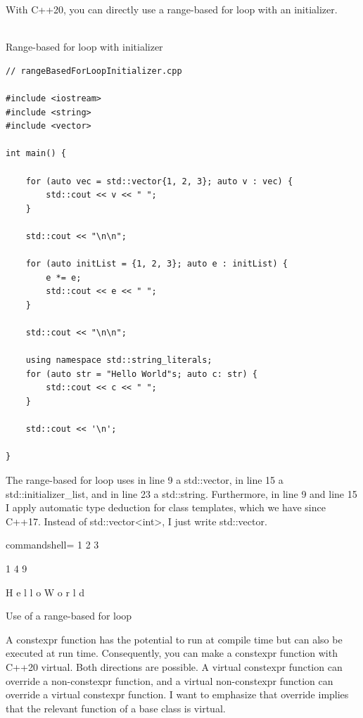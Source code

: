 
With C++20, you can directly use a range-based for loop with an initializer.

\hspace*{\fill} \\ %
\noindent
Range-based for loop with initializer
\begin{lstlisting}[style=styleCXX]
// rangeBasedForLoopInitializer.cpp

#include <iostream>
#include <string>
#include <vector>

int main() {

	for (auto vec = std::vector{1, 2, 3}; auto v : vec) {
		std::cout << v << " ";
	}
	
	std::cout << "\n\n";
	
	for (auto initList = {1, 2, 3}; auto e : initList) {
		e *= e;
		std::cout << e << " ";
	}
	
	std::cout << "\n\n";
	
	using namespace std::string_literals;
	for (auto str = "Hello World"s; auto c: str) {
		std::cout << c << " ";
	}
	
	std::cout << '\n';

}
\end{lstlisting}

The range-based for loop uses in line 9 a std::vector, in line 15 a std::initializer\_list, and in line 23 a std::string. Furthermore, in line 9 and line 15 I apply automatic type deduction for class templates, which we have since C++17. Instead of std::vector<int>, I just write std::vector.

\begin{tcblisting}{commandshell={}}
1 2 3

1 4 9

H e l l o  W o r l d
\end{tcblisting}

\begin{center}
Use of a range-based for loop
\end{center}


A constexpr function has the potential to run at compile time but can also be executed at run time. Consequently, you can make a constexpr function with C++20 virtual. Both directions are possible. A virtual constexpr function can override a non-constexpr function, and a virtual non-constexpr function can override a virtual constexpr function. I want to emphasize that override implies that the relevant function of a base class is virtual.

